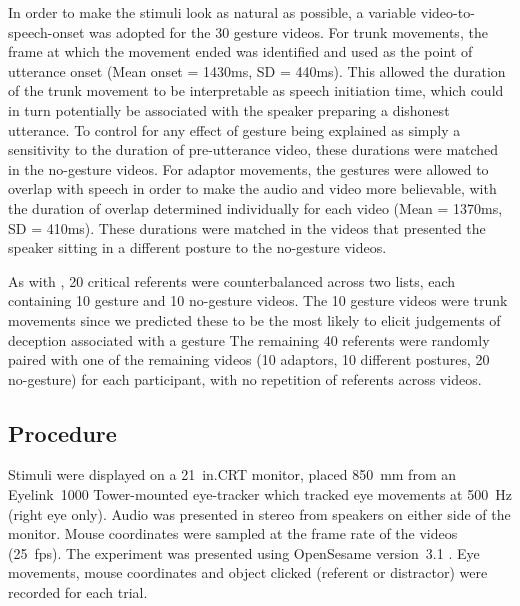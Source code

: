 \documentclass[a4paper,man,natbib]{apa6}
\begin{document}
In order to make the stimuli look as natural as possible, a variable video-to-speech-onset was adopted for the 30 gesture videos.
For trunk movements, the frame at which the movement ended was identified and used as the point of utterance onset (Mean onset = 1430ms, SD = 440ms).
This allowed the duration of the trunk movement to be interpretable as speech initiation time, which could in turn potentially be associated with the speaker preparing a dishonest utterance.
To control for any effect of gesture being explained as simply a sensitivity to the duration of pre-utterance video, these durations were matched in the no-gesture videos.
For adaptor movements, the gestures were allowed to overlap with speech in order to make the audio and video more believable, with the duration of overlap determined individually for each video (Mean = 1370ms, SD = 410ms).
These durations were matched in the videos that presented the speaker sitting in a different posture to the no-gesture videos.

As with \citep{Loy2017}, 20 critical referents were counterbalanced across two lists, each containing 10 gesture and 10 no-gesture videos.
The 10 gesture videos were trunk movements since we predicted these to be the most likely to elicit judgements of deception associated with a gesture \citep{Vrij1996a}
The remaining 40 referents were randomly paired with one of the remaining videos (10 adaptors, 10 different postures, 20 no-gesture) for each participant, with no repetition of referents across videos.

\subsection{Procedure}
Stimuli were displayed on a 21~in.\@ CRT monitor, placed 850~mm from an Eyelink~1000 Tower-mounted eye-tracker which tracked eye movements at 500~Hz (right eye only). 
Audio was presented in stereo from speakers on either side of the monitor. 
Mouse coordinates were sampled at the frame rate of the videos (25~fps). 
The experiment was presented using OpenSesame version~3.1 \citep{Mathot2012}.
Eye movements, mouse coordinates and object clicked (referent or distractor) were recorded for each trial.
\end{document}

